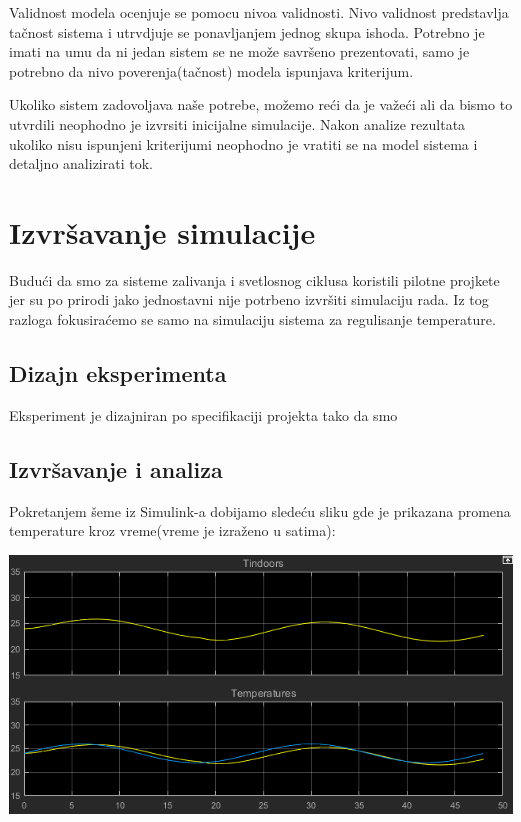 \documentclass[a4paper,11pt]{book}
\begin{document}
Validnost modela ocenjuje se pomocu nivoa validnosti. Nivo validnost predstavlja tačnost sistema i utrvdjuje se ponavljanjem jednog skupa ishoda. Potrebno je imati na umu da ni jedan sistem se ne može savršeno prezentovati, samo je potrebno da nivo poverenja(tačnost) modela ispunjava kriterijum.

Ukoliko sistem zadovoljava naše potrebe, možemo reći da je važeći ali da bismo to utvrdili neophodno je izvrsiti inicijalne simulacije. Nakon analize rezultata ukoliko nisu ispunjeni kriterijumi neophodno je vratiti se na model sistema i detaljno analizirati tok. 


\chapter{Izvršavanje simulacije}

Budući da smo za sisteme zalivanja i svetlosnog ciklusa koristili pilotne projkete jer su po prirodi jako jednostavni nije potrbeno izvršiti simulaciju rada. Iz tog razloga fokusiraćemo se samo na simulaciju sistema za regulisanje temperature. 


\section{Dizajn eksperimenta}

Eksperiment je dizajniran po specifikaciji projekta tako da smo 
\section{Izvršavanje i analiza}

Pokretanjem šeme iz Simulink-a dobijamo sledeću sliku gde je prikazana promena temperature kroz vreme(vreme je izraženo u satima):

\includegraphics[width=\textwidth]{done.png}
\end{document}

